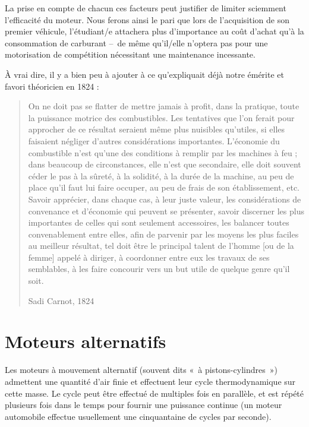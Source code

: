 		La prise en compte de chacun ces facteurs peut justifier de limiter sciemment l’efficacité du moteur. Nous ferons ainsi le pari que lors de l’acquisition de son premier véhicule, l’étudiant/e attachera plus d’importance au coût d’achat qu’à la consommation de carburant --\ de même qu’il/\-elle n’optera pas pour une motorisation de compétition nécessitant une maintenance incessante.
		
		À vrai dire, il y a bien peu à ajouter à ce qu’expliquait déjà notre émérite et favori théoricien en 1824 :

		\begin{quote}
			On ne doit pas se flatter de mettre jamais à profit, dans la pratique, toute la puissance motrice des combustibles. Les tentatives que l’on ferait pour approcher de ce résultat seraient même plus nuisibles qu’utiles, si elles faisaient négliger d’autres considérations importantes. L’économie du combustible n’est qu’une des conditions à remplir par les machines à feu ; dans beaucoup de circonstances, elle n’est que secondaire, elle doit souvent céder le pas à la sûreté, à la solidité, à la durée de la machine, au peu de place qu’il faut lui faire occuper, au peu de frais de son établissement, etc. Savoir apprécier, dans chaque cas, à leur juste valeur, les considérations de convenance et d’économie qui peuvent se présenter, savoir discerner les plus importantes de celles qui sont seulement accessoires, les balancer toutes convenablement entre elles, afin de parvenir par les moyens les plus faciles au meilleur résultat, tel doit être le principal talent de l’homme [ou de la femme] appelé à diriger, à coordonner entre eux les travaux de ses semblables, à les faire concourir vers un but utile de quelque genre qu’il soit.
			\begin{flushright}
				Sadi Carnot, 1824~\cite{carnot1824}
			\end{flushright}
		\end{quote}



\section{Moteurs alternatifs}
\label{ch_moteurs_alternatifs}

Les moteurs à mouvement alternatif (souvent dits «~à pistons-cylindres~») admettent une quantité d’air finie et effectuent leur cycle thermodynamique sur cette masse. Le cycle peut être effectué de multiples fois en parallèle, et est répété plusieurs fois dans le temps pour fournir une puissance continue (un moteur automobile effectue usuellement une cinquantaine de cycles par seconde).

